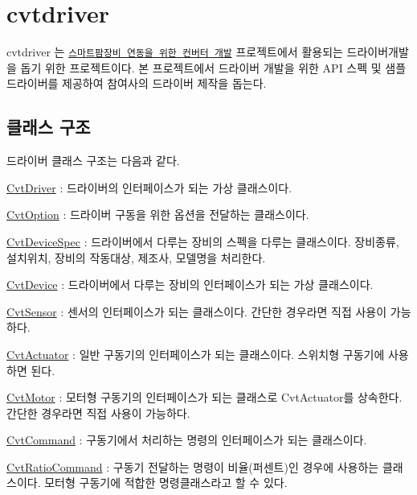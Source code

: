 \section*{cvtdriver}

cvtdriver 는 \href{https://github.com/ebio-snu/stdcvt}{\tt 스마트팜장비 연동을 위한 컨버터 개발} 프로젝트에서 활용되는 드라이버개발을 돕기 위한 프로젝트이다. 본 프로젝트에서 드라이버 개발을 위한 A\+PI 스펙 및 샘플 드라이버를 제공하여 참여사의 드라이버 제작을 돕는다.

\subsection*{클래스 구조}

드라이버 클래스 구조는 다음과 같다.




\begin{DoxyItemize}
\item \hyperlink{classstdcvt_1_1CvtDriver}{Cvt\+Driver} \+: 드라이버의 인터페이스가 되는 가상 클래스이다.
\item \hyperlink{classstdcvt_1_1CvtOption}{Cvt\+Option} \+: 드라이버 구동을 위한 옵션을 전달하는 클래스이다.
\item \hyperlink{classstdcvt_1_1CvtDeviceSpec}{Cvt\+Device\+Spec} \+: 드라이버에서 다루는 장비의 스펙을 다루는 클래스이다. 장비종류, 설치위치, 장비의 작동대상, 제조사, 모델명을 처리한다.
\item \hyperlink{classstdcvt_1_1CvtDevice}{Cvt\+Device} \+: 드라이버에서 다루는 장비의 인터페이스가 되는 가상 클래스이다.
\begin{DoxyItemize}
\item \hyperlink{classstdcvt_1_1CvtSensor}{Cvt\+Sensor} \+: 센서의 인터페이스가 되는 클래스이다. 간단한 경우라면 직접 사용이 가능하다.
\item \hyperlink{classstdcvt_1_1CvtActuator}{Cvt\+Actuator} \+: 일반 구동기의 인터페이스가 되는 클래스이다. 스위치형 구동기에 사용하면 된다.
\item \hyperlink{classstdcvt_1_1CvtMotor}{Cvt\+Motor} \+: 모터형 구동기의 인터페이스가 되는 클래스로 Cvt\+Actuator를 상속한다. 간단한 경우라면 직접 사용이 가능하다.
\end{DoxyItemize}
\item \hyperlink{classstdcvt_1_1CvtCommand}{Cvt\+Command} \+: 구동기에서 처리하는 명령의 인터페이스가 되는 클래스이다.
\begin{DoxyItemize}
\item \hyperlink{classstdcvt_1_1CvtRatioCommand}{Cvt\+Ratio\+Command} \+: 구동기 전달하는 명령이 비율(퍼센트)인 경우에 사용하는 클래스이다. 모터형 구동기에 적합한 명령클래스라고 할 수 있다.
\end{DoxyItemize}
\end{DoxyItemize}

